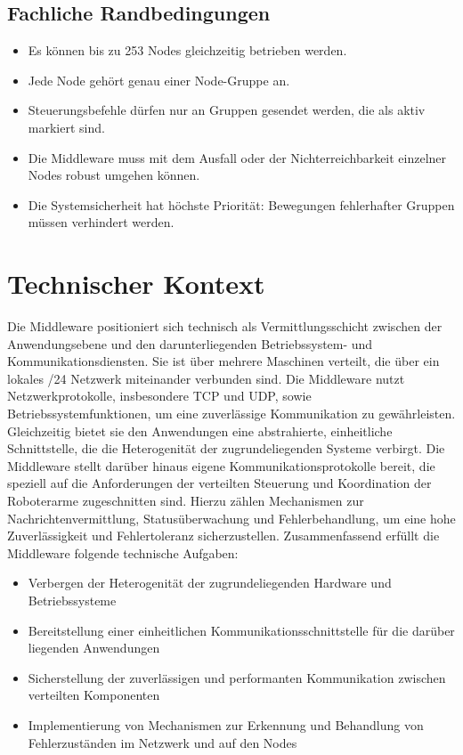 \subsection{Fachliche Randbedingungen}

\begin{itemize}
	\item Es können bis zu 253 Nodes gleichzeitig betrieben werden.
	\item Jede Node gehört genau einer Node-Gruppe an.
	\item Steuerungsbefehle dürfen nur an Gruppen gesendet werden, die als aktiv markiert sind.
	\item Die Middleware muss mit dem Ausfall oder der Nichterreichbarkeit einzelner Nodes robust umgehen können.
	\item Die Systemsicherheit hat höchste Priorität: Bewegungen fehlerhafter Gruppen müssen verhindert werden.
\end{itemize}

\section{Technischer Kontext}

Die Middleware positioniert sich technisch als Vermittlungsschicht zwischen der Anwendungsebene und den darunterliegenden Betriebssystem- und Kommunikationsdiensten. Sie ist über mehrere Maschinen verteilt, die über ein lokales /24 Netzwerk miteinander verbunden sind.
Die Middleware nutzt Netzwerkprotokolle, insbesondere TCP und UDP, sowie Betriebssystemfunktionen, um eine zuverlässige Kommunikation zu gewährleisten. Gleichzeitig bietet sie den Anwendungen eine abstrahierte, einheitliche Schnittstelle, die die Heterogenität der zugrundeliegenden Systeme verbirgt.
Die Middleware stellt darüber hinaus eigene Kommunikationsprotokolle bereit, die speziell auf die Anforderungen der verteilten Steuerung und Koordination der Roboterarme zugeschnitten sind. Hierzu zählen Mechanismen zur Nachrichtenvermittlung, Statusüberwachung und Fehlerbehandlung, um eine hohe Zuverlässigkeit und Fehlertoleranz sicherzustellen.
Zusammenfassend erfüllt die Middleware folgende technische Aufgaben:
\begin{itemize}
	\item Verbergen der Heterogenität der zugrundeliegenden Hardware und Betriebssysteme
	\item Bereitstellung einer einheitlichen Kommunikationsschnittstelle für die darüber liegenden Anwendungen
	\item Sicherstellung der zuverlässigen und performanten Kommunikation zwischen verteilten Komponenten
	\item Implementierung von Mechanismen zur Erkennung und Behandlung von Fehlerzuständen im Netzwerk und auf den Nodes
\end{itemize}

